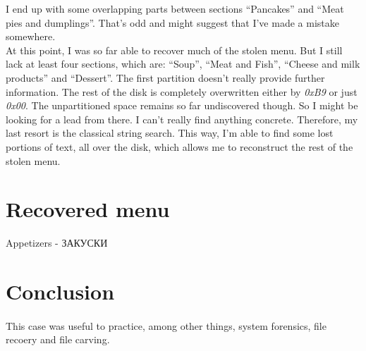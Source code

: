 \documentclass[
	12pt, %
]{fphw}
\begin{document}
I end up with some overlapping parts between sections “Pancakes” and “Meat pies and dumplings”.
That’s odd and might suggest that I’ve made a mistake somewhere.\\

At this point, I was so far able to recover much of the stolen menu. But I still lack at least four
sections, which are: “Soup”, “Meat and Fish”, “Cheese and milk products” and “Dessert”. The first
partition doesn’t really provide further information. The rest of the disk is completely overwritten
either by \textit{0xB9} or just \textit{0x00}. The unpartitioned space remains so far undiscovered though. So I might
be looking for a lead from there. I can’t really find anything concrete. Therefore, my last resort is the
classical string search. This way, I’m able to find some lost portions of text, all over the disk, which
allows me to reconstruct the rest of the stolen menu.

\section{Recovered menu}
\label{sec:doc2}

Appetizers - ЗАКУСКИ


\section*{Conclusion}
\label{sec:conclusion}

\paragraph{}
This case was useful to practice, among other things, system forensics, file recoery and file carving.\\





\end{document}
